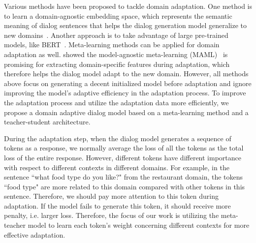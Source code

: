 \documentclass[letterpaper]{article} %
\begin{document}

Various methods have been proposed to tackle domain adaptation.
%
One method is to learn a domain-agnostic embedding space, which represents the semantic meaning of dialog sentences that helps the dialog generation model generalize to new domains~\citep{zhao2018zero}.
%
Another approach is to take advantage of large pre-trained models, like BERT~\citep{Devlin2019BERTPO}.
%
Meta-learning methods can be applied for domain adaptation as well.  \citet{qian2019domain} showed the model-agnostic meta-learning  (MAML)~\citep{finn2017model} is promising for extracting domain-specific features during adaptation, which therefore helps the dialog model adapt to the new domain.
%
However, all methods above focus on generating a decent initialized model before adaptation and ignore improving the model's adaptive efficiency in the adaptation process.
%
To improve the adaptation process and utilize the adaptation data more efficiently, we propose a domain adaptive dialog model based on a meta-learning method and a teacher-student architecture.

During the adaptation step, when the dialog model generates a sequence of tokens as a response, we normally average the loss of all the tokens as the total loss of the entire response.
%
However, different tokens have different importance with respect to different contexts in different domains.
%
For example, in the sentence ``what food type do you like?" from the restaurant domain, the tokens ``food type" are more related to this domain compared with other tokens in this sentence.
%
Therefore, we should pay more attention to this token during adaptation.  If the model fails to generate this token, it should receive more penalty, i.e. larger loss.
%
Therefore, the focus of our work is utilizing the meta-teacher model to learn each token's weight concerning different contexts for more effective adaptation.
\end{document}
